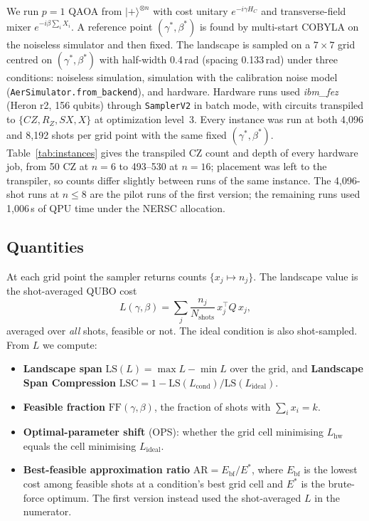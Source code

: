 \documentclass[conference]{IEEEtran}
\newcommand{\LS}{\mathrm{LS}}
\newcommand{\LSC}{\mathrm{LSC}}
\newcommand{\FF}{\mathrm{FF}}
\newcommand{\AR}{\mathrm{AR}}
\begin{document}
We run $p{=}1$ QAOA from $|{+}\rangle^{\otimes n}$ with cost unitary
$e^{-i\gamma H_C}$ and transverse-field mixer $e^{-i\beta\sum_i X_i}$.
A reference point $(\gamma^*,\beta^*)$ is found by multi-start COBYLA
on the noiseless simulator and then fixed. The landscape is sampled on a
$7{\times}7$ grid centred on $(\gamma^*,\beta^*)$ with half-width
0.4\,rad (spacing 0.133\,rad) under three conditions: noiseless
simulation, simulation with the calibration noise model
(\texttt{AerSimulator.from\_backend}), and hardware. Hardware runs used
\textit{ibm\_fez} (Heron r2, 156 qubits) through \texttt{SamplerV2} in
batch mode, with circuits transpiled to $\{CZ, R_Z, SX, X\}$ at
optimization level~3. Every instance was run at both 4{,}096 and 8{,}192
shots per grid point with the same fixed $(\gamma^*,\beta^*)$. Table~\ref{tab:instances}
gives the transpiled CZ count and depth of every hardware job, from 50
CZ at $n{=}6$ to 493--530 at $n{=}16$; placement was left to the
transpiler, so counts differ slightly between runs of the same instance.
The 4{,}096-shot runs at $n{\le}8$ are the pilot runs of the first
version; the remaining runs used 1{,}006\,s of QPU time under the NERSC
allocation.

\subsection{Quantities}
\label{sec:quantities}

At each grid point the sampler returns counts $\{x_j \mapsto n_j\}$.
The landscape value is the shot-averaged QUBO cost
\begin{equation}
  L(\gamma,\beta) = \sum_j \frac{n_j}{N_\mathrm{shots}}\, x_j^\top Q\, x_j ,
  \label{eq:L}
\end{equation}
averaged over \emph{all} shots, feasible or not. The ideal condition is
also shot-sampled. From $L$ we compute:

\begin{itemize}
  \item \textbf{Landscape span} $\LS(L)=\max L - \min L$ over the grid,
        and \textbf{Landscape Span Compression}
        $\LSC = 1 - \LS(L_\mathrm{cond})/\LS(L_\mathrm{ideal})$.
  \item \textbf{Feasible fraction} $\FF(\gamma,\beta)$, the fraction
        of shots with $\sum_i x_i = k$.
  \item \textbf{Optimal-parameter shift} (OPS): whether the grid cell
        minimising $L_\mathrm{hw}$ equals the cell minimising
        $L_\mathrm{ideal}$.
  \item \textbf{Best-feasible approximation ratio}
        $\AR = E_\mathrm{bf}/E^*$, where $E_\mathrm{bf}$ is the lowest
        cost among feasible shots at a condition's best grid cell and
        $E^*$ is the brute-force optimum. The first version instead
        used the shot-averaged $L$ in the numerator.
\end{itemize}
\end{document}
